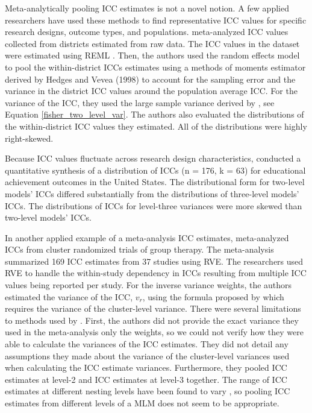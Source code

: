 Meta-analytically pooling ICC estimates is not a novel notion. A few applied researchers have used these methods to find representative ICC values for specific research designs, outcome types, and populations.  meta-analyzed ICC values collected from districts estimated from raw data. The ICC values in the dataset were estimated using REML \cite{hedges2013}. Then, the authors used the random effects model to pool the within-district ICCs estimates using a methods of moments estimator derived by Hedges and Vevea (1998) to account for the sampling error and the variance in the district ICC values around the population average ICC. For the variance of the ICC, they used the large sample variance derived by , see Equation \ref{fisher_two_level_var}. The authors also evaluated the distributions of the within-district ICC values they estimated. All of the distributions were highly right-skewed.

Because ICC values fluctuate across research design characteristics,  conducted a quantitative synthesis of a distribution of ICCs (n = 176, k = 63) for educational achievement outcomes in the United States. The distributional form for two-level models' ICCs differed substantially from the distributions of three-level models' ICCs. The distributions of ICCs for level-three variances were more skewed than two-level models' ICCs.

In another applied example of a meta-analysis ICC estimates,  meta-analyzed ICCs from cluster randomized trials of group therapy. The meta-analysis summarized 169 ICC estimates from 37 studies using RVE. The researchers used RVE to handle the within-study dependency in ICCs resulting from multiple ICC values being reported per study. For the inverse variance weights, the authors estimated the variance of the ICC, $v_r$, using the formula proposed by  which requires the variance of the cluster-level variance. There were several limitations to methods used by  . First, the authors did not provide the exact variance they used in the meta-analysis only the weights, so we could not verify how they were able to calculate the variances of the ICC estimates. They did not detail any assumptions they made about the variance of the cluster-level variances used when calculating the ICC estimate variances. Furthermore, they pooled ICC estimates at level-2 and ICC estimates at level-3 together. The range of ICC estimates at different nesting levels have been found to vary \cite{hedgesIntraclassCorrelationValues2007a, hedges2013}, so pooling ICC estimates from different levels of a MLM does not seem to be appropriate.

